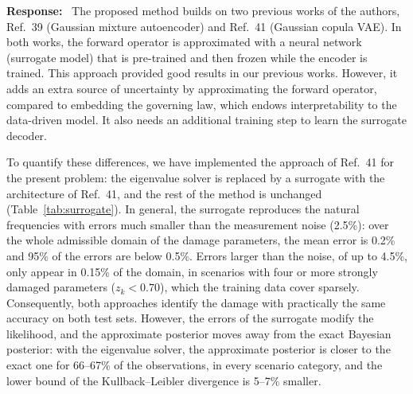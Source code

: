 \documentclass[11pt]{article}
\newenvironment{response}{\par\smallskip\noindent\color{resp}\textbf{Response:}\ }{\par}
\begin{document}
\begin{response}
The proposed method builds on two previous works of the authors, Ref.~39 (Gaussian mixture autoencoder) and Ref.~41 (Gaussian copula VAE).
In both works, the forward operator is approximated with a neural network (surrogate model) that is pre-trained and then frozen while the encoder is trained.
This approach provided good results in our previous works.
However, it adds an extra source of uncertainty by approximating the forward operator, compared to embedding the governing law, which endows interpretability to the data-driven model.
It also needs an additional training step to learn the surrogate decoder.

To quantify these differences, we have implemented the approach of Ref.~41 for the present problem: the eigenvalue solver is replaced by a surrogate with the architecture of Ref.~41, and the rest of the method is unchanged (Table~\ref{tab:surrogate}).
In general, the surrogate reproduces the natural frequencies with errors much smaller than the measurement noise (2.5\%): over the whole admissible domain of the damage parameters, the mean error is 0.2\% and 95\% of the errors are below 0.5\%.
Errors larger than the noise, of up to 4.5\%, only appear in 0.15\% of the domain, in scenarios with four or more strongly damaged parameters ($z_k<0.70$), which the training data cover sparsely.
Consequently, both approaches identify the damage with practically the same accuracy on both test sets.
However, the errors of the surrogate modify the likelihood, and the approximate posterior moves away from the exact Bayesian posterior: with the eigenvalue solver, the approximate posterior is closer to the exact one for 66--67\% of the observations, in every scenario category, and the lower bound of the Kullback--Leibler divergence is 5--7\% smaller.


\end{response}
\end{document}
